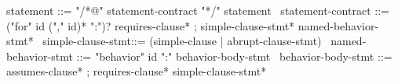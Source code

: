 \begin{syntax}
  statement ::= "/*@" statement-contract "*/" statement
  \
  statement-contract ::= {("for" id ("," id)* ":")?} requires-clause* ;
    simple-clause-stmt* named-behavior-stmt*
  \
  simple-clause-stmt::= (simple-clause | abrupt-clause-stmt)
  \
  named-behavior-stmt ::= "behavior" id ":" behavior-body-stmt
  \
  behavior-body-stmt ::= assumes-clause* ;
       requires-clause* simple-clause-stmt*
\end{syntax}
